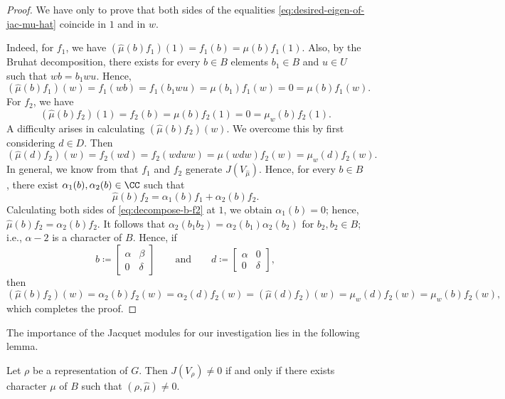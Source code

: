 \documentclass[../main.tex]{subfiles}
\begin{document}
\begin{proof}
	We have only to prove that both sides of the equalities \eqref{eq:desired-eigen-of-jac-mu-hat} coincide in $1$ and in $w$.

	Indeed, for $f_1$, we have $\left(\widehat\mu(b)f_1\right)(1)=f_1(b)=\mu(b)f_1(1)$. Also, by the Bruhat decomposition, there exists for every $b\in B$ elements $b_1\in B$ and $u\in U$ such that $wb=b_1wu$. Hence,
	\[\left(\widehat\mu(b)f_1\right)(w)=f_1(wb)=f_1(b_1wu)=\mu(b_1)f_1(w)=0=\mu(b)f_1(w).\]
	For $f_2$, we have
	\[\left(\widehat\mu(b)f_2\right)(1)=f_2(b)=\mu(b)f_2(1)=0=\mu_w(b)f_2(1).\]
	A difficulty arises in calculating $\left(\widehat\mu(b)f_2\right)(w)$. We overcome this by first considering $d\in D$. Then
	\begin{equation}
		\left(\widehat\mu(d)f_2\right)(w)=f_2(wd)=f_2(wdww)=\mu(wdw)f_2(w)=\mu_w(d)f_2(w). \label{eq:desired-eigen-of-jac-mu-hat-d}
	\end{equation}
	In general, we know from  that $f_1$ and $f_2$ generate $J(V_{\widehat\mu})$. Hence, for every $b\in B$, there exist $\alpha_1(b),\alpha_2(b)\in\CC$ such that
	\begin{equation}
		\widehat\mu(b)f_2=\alpha_1(b)f_1+\alpha_2(b)f_2. \label{eq:decompose-b-f2}
	\end{equation}
	Calculating both sides of \eqref{eq:decompose-b-f2} at $1$, we obtain $\alpha_1(b)=0$; hence, $\widehat\mu(b)f_2=\alpha_2(b)f_2$. It follows that $\alpha_2(b_1b_2)=\alpha_2(b_1)\alpha_2(b_2)$ for $b_2,b_2\in B$; i.e., $\alpha-2$ is a character of $B$. Hence, if
	\[b\coloneqq\begin{bmatrix}
		\alpha & \beta \\
		0 & \delta
	\end{bmatrix}\qquad\text{and}\qquad d\coloneqq\begin{bmatrix}
		\alpha & 0 \\
		0 & \delta
	\end{bmatrix},\]
	then
	\[\left(\widehat\mu(b)f_2\right)(w)=\alpha_2(b)f_2(w)=\alpha_2(d)f_2(w)=\left(\widehat\mu(d)f_2\right)(w)=\mu_w(d)f_2(w)=\mu_w(b)f_2(w),\]
	which completes the proof.
\end{proof}
The importance of the Jacquet modules for our investigation lies in the following lemma.
\begin{lemma} \label{lem:use-of-jac}
	Let $\rho$ be a representation of $G$. Then $J(V_\rho)\ne0$ if and only if there exists character $\mu$ of $B$ such that $\left(\rho,\widehat\mu\right)\ne0$.
\end{lemma}
\end{document}
